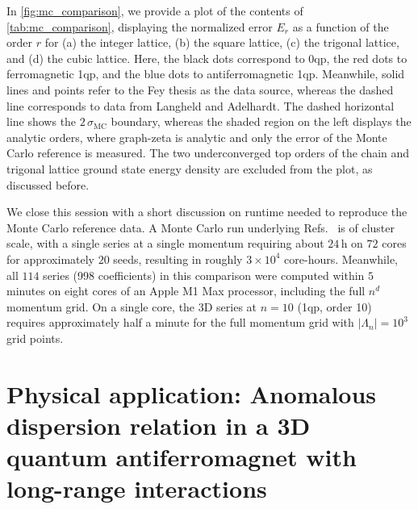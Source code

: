 \documentclass[]{amsart}
\numberwithin{mythm}{section}
\begin{document}
In \cref{fig:mc_comparison}, we provide a plot of the contents of \cref{tab:mc_comparison}, displaying the normalized error $E_r$ as a function of the order $r$ for (a) the integer lattice, (b) the square lattice, (c) the trigonal lattice, and (d) the cubic lattice. Here, the black dots correspond to 0qp, the red dots to ferromagnetic 1qp, and the blue dots to antiferromagnetic 1qp. Meanwhile, solid lines and points refer to the Fey thesis as the data source, whereas the dashed line corresponds to data from Langheld and Adelhardt. The dashed horizontal line shows the $2\,\sigma_{\mathrm{MC}}$ boundary, whereas the shaded region on the left displays the analytic orders, where graph-zeta is analytic and only the error of the Monte Carlo reference is measured. The two underconverged top orders of the chain and trigonal lattice ground state energy density are excluded from the plot, as discussed before. 

We close this session with a short discussion on runtime needed to reproduce the Monte Carlo reference data. A Monte Carlo run underlying Refs.~\cite{fey2019quantum,Fey2020Diss,
Langheld2022,adelhardt2024monte} is of cluster scale, with a single series at a single momentum
requiring about $24\,\mathrm{h}$ on $72$ cores for approximately $20$ seeds, resulting in roughly
$3\times10^4$ core-hours. Meanwhile, all $114$ series (998 coefficients) in this comparison were computed within $5$ minutes on eight cores of an Apple M1 Max processor, including the full $n^d$ momentum grid. On a single core, the 3D series at $n=10$ (1qp, order 10) requires approximately half a minute for the full momentum grid with $|\Lambda_n|=10^3$ grid points.


 

\section{Physical application: Anomalous dispersion relation in a 3D quantum antiferromagnet with long-range interactions}
\label{sec:lrtfim}
\end{document}
